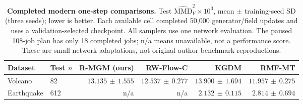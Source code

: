 \begin{table}[t]
\centering\small
\caption{\textbf{Completed modern one-step comparisons.} Test $\widehat{\mathrm{MMD}}_V^2\times10^3$, mean $\pm$ training-seed SD (three seeds); lower is better. Each available cell completed 50,000 generator/field updates and uses a validation-selected checkpoint. All samplers use one network evaluation. The paused 108-job plan has only 18 completed jobs; n/a means unavailable, not a performance score. These are small-network adaptations, not original-author benchmark reproductions.}
\label{tab:recent}
\begin{tabular}{@{}llrrrr@{}}
\toprule
Dataset & Test $n$ & R-MGM (ours) & RW-Flow-C & KGDM & RMF-MT \\
\midrule
Volcano & 82 & $13.135\,\pm\,1.555$ & $12.537\,\pm\,0.277$ & $13.900\,\pm\,1.694$ & $11.957\,\pm\,0.275$ \\
Earthquake & 612 & n/a & n/a & $2.132\,\pm\,0.115$ & $2.814\,\pm\,0.694$ \\
\bottomrule
\end{tabular}
\end{table}
